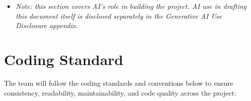 \documentclass{article}
\begin{document}
\begin{itemize}
\begin{itemize}
                    being committed. Data structure choices, naming
                    conventions, and other design decisions are made by the
                    team, not the AI.
              \item AI may assist in generating unit tests and identifying edge
                    cases, but all generated tests must be reviewed and
                    understood by the team, not accepted blindly.
              \item Team members must manually verify that AI-generated tests
                    are actually testing the intended behaviour (e.g. by
                    intentionally breaking the implementation and confirming
                    the test fails).
          \end{itemize}
    \item \textit{Note: this section covers AI's role in building the project. AI use in drafting this document itself is disclosed separately in the Generative AI Use Disclosure appendix.}
\end{itemize}

\section{Coding Standard}

\label{sec:coding-standard}


The team will follow the coding standards and conventions below to ensure
consistency, readability, maintainability, and code quality across the project:
\end{document}
